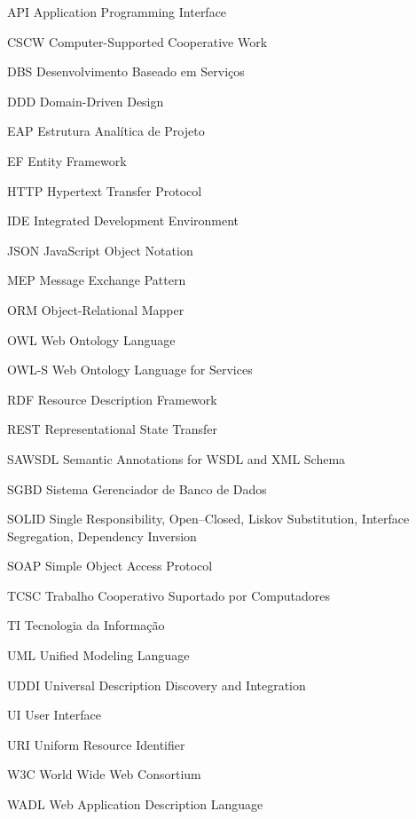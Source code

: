 \begin{siglas}
    \item[API]          Application Programming Interface
    \item[CSCW]         Computer-Supported Cooperative Work
    \item[DBS]          Desenvolvimento Baseado em Serviços
    \item[DDD]          Domain-Driven Design
    \item[EAP]          Estrutura Analítica de Projeto
    \item[EF]           Entity Framework
    \item[HTTP]         Hypertext Transfer Protocol
    \item[IDE]          Integrated Development Environment
    \item[JSON]         JavaScript Object Notation
    \item[MEP]          Message Exchange Pattern
    \item[ORM]          Object-Relational Mapper
    \item[OWL]          Web Ontology Language
    \item[OWL-S]        Web Ontology Language for Services
    \item[RDF]          Resource Description Framework
    \item[REST]         Representational State Transfer
    \item[SAWSDL]       Semantic Annotations for WSDL and XML Schema
    \item[SGBD]         Sistema Gerenciador de Banco de Dados
    \item[SOLID]        Single Responsibility, Open–Closed, Liskov Substitution, Interface Segregation, Dependency Inversion
    \item[SOAP]         Simple Object Access Protocol
    \item[TCSC]         Trabalho Cooperativo Suportado por Computadores
    \item[TI]           Tecnologia da Informação
    \item[UML]          Unified Modeling Language
    \item[UDDI]         Universal Description Discovery and Integration
    \item[UI]           User Interface
    \item[URI]          Uniform Resource Identifier
    \item[W3C]          World Wide Web Consortium
    \item[WADL]         Web Application Description Language

\end{siglas}
